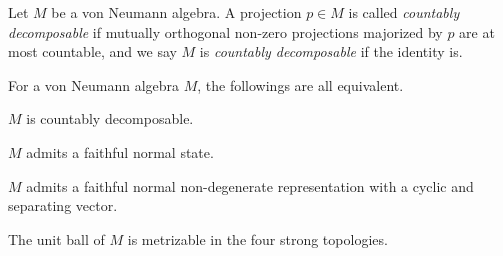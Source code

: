 \documentclass{../../small}
\begin{document}
\begin{defn}
Let $M$ be a von Neumann algebra.
A projection $p\in M$ is called \emph{countably decomposable} if mutually orthogonal non-zero projections majorized by $p$ are at most countable, and we say $M$ is \emph{countably decomposable} if the identity is.
\end{defn}
\begin{prop}
For a von Neumann algebra $M$, the followings are all equivalent.
\begin{parts}
\item $M$ is countably decomposable.
\item $M$ admits a faithful normal state.
\item $M$ admits a faithful normal non-degenerate representation with a cyclic and separating vector.
\item The unit ball of $M$ is metrizable in the four strong topologies.
\end{parts}
\end{prop}
\end{document}
